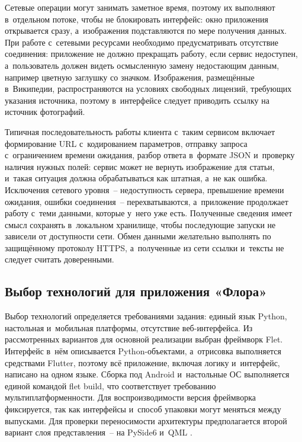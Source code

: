 \documentclass[14pt,a4paper]{extarticle}
\begin{document}
Сетевые операции могут занимать заметное время, поэтому их выполняют в~отдельном потоке, чтобы не блокировать интерфейс: окно приложения открывается сразу, а~изображения подставляются по мере получения данных. При работе с~сетевыми ресурсами необходимо предусматривать отсутствие соединения: приложение не должно прекращать работу, если сервис недоступен, а~пользователь должен видеть осмысленную замену недостающим данным, например цветную заглушку со значком. Изображения, размещённые в~Википедии, распространяются на условиях свободных лицензий, требующих указания источника, поэтому в~интерфейсе следует приводить ссылку на источник фотографий.



Типичная последовательность работы клиента с~таким сервисом включает формирование URL с~кодированием параметров, отправку запроса с~ограничением времени ожидания, разбор ответа в~формате JSON и~проверку наличия нужных полей: сервис может не вернуть изображение для статьи, и~такая ситуация должна обрабатываться как штатная, а~не как ошибка. Исключения сетевого уровня~– недоступность сервера, превышение времени ожидания, ошибки соединения~– перехватываются, а~приложение продолжает работу с~теми данными, которые у~него уже есть. Полученные сведения имеет смысл сохранять в~локальном хранилище, чтобы последующие запуски не зависели от доступности сети. Обмен данными желательно выполнять по защищённому протоколу HTTPS, а~полученные из сети ссылки и~тексты не следует считать доверенными.



\subsection{Выбор технологий для приложения «Флора»}

Выбор технологий определяется требованиями задания: единый язык Python, настольная и~мобильная платформы, отсутствие веб-интерфейса. Из рассмотренных вариантов для основной реализации выбран фреймворк Flet. Интерфейс в~нём описывается Python-объектами, а~отрисовка выполняется средствами Flutter, поэтому всё приложение, включая логику и~интерфейс, написано на одном языке. Сборка под Android и~настольные ОС выполняется единой командой flet build, что соответствует требованию мультиплатформенности. Для воспроизводимости версия фреймворка фиксируется, так как интерфейсы и~способ упаковки могут меняться между выпусками. Для проверки переносимости архитектуры предполагается второй вариант слоя представления~– на PySide6 и~QML \cite{b3,b8}.
\end{document}
